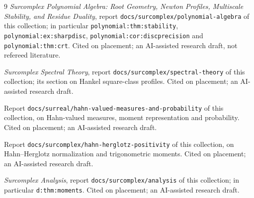 \documentclass[11pt,letterpaper]{article}
\theoremstyle{definition}
\theoremstyle{remark}
\newcommand{\lbl}[1]{\nolinkurl{#1}}%
\begin{document}
\begin{thebibliography}{9}
\emph{Surcomplex Polynomial Algebra: Root Geometry, Newton Profiles,
Multiscale Stability, and Residue Duality}, report
\lbl{docs/surcomplex/polynomial-algebra} of this collection; in particular
\lbl{polynomial:thm:stability}, \lbl{polynomial:ex:sharpdisc},
\lbl{polynomial:cor:discprecision} and \lbl{polynomial:thm:crt}.
Cited on placement; an AI-assisted research draft, not refereed literature.

\emph{Surcomplex Spectral Theory}, report
\lbl{docs/surcomplex/spectral-theory} of this collection; its section on
Hankel square-class profiles. Cited on placement; an AI-assisted research
draft.

Report \lbl{docs/surreal/hahn-valued-measures-and-probability} of this
collection, on Hahn-valued measures, moment representation and probability.
Cited on placement; an AI-assisted research draft.

Report \lbl{docs/surcomplex/hahn-herglotz-positivity} of this collection,
on Hahn--Herglotz normalization and trigonometric moments. Cited on
placement; an AI-assisted research draft.

\emph{Surcomplex Analysis}, report \lbl{docs/surcomplex/analysis} of this
collection; in particular \lbl{d:thm:moments}. Cited on placement; an
AI-assisted research draft.
\end{thebibliography}
\end{document}
